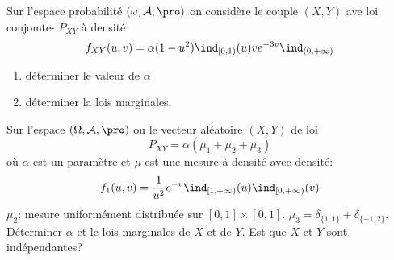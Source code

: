 \begin{examplebox}
	Sur l'espace probabilité $(\omega, \mathcal{A}, \pro)$ on considère le couple $(X, Y)$ ave loi conjomte- $P_{XY}$ à densité
	$$f_{XY}(u,v)=\alpha(1-u^2)\ind_{[0,1)}(u)v e^{-3v}\ind_{(0, +\infty)}$$
	\begin{enumerate}
		\item déterminer le valeur de $\alpha$
		\item déterminer la lois marginales.
	\end{enumerate}
\end{examplebox}

\begin{examplebox}
	Sur l'espace $(\Omega,\mathcal{A},\pro)$ ou le vecteur aléatoire $(X, Y)$ de loi
	$$P_{XY}=\alpha(\mu_1+\mu_2+\mu_3)$$
	où $\alpha$ est un paramètre et $\mu$ est une mesure à densité avec densité:
		$$f_1(u, v)=\frac{1}{u^2}e^{-v}\ind_{[1,+\infty)}(u)\ind_{[0, +\infty)}(v)$$
	$\mu_2$: mesure uniformément distribuée sur $[0,1]\times[0,1]$. $\mu_3=\delta_{\{1,1\}}+\delta_{\{-1,2\}}$. Déterminer $\alpha$ et le lois marginales de $X$ et de $Y$. Est que $X$ et $Y$ sont indépendantes?
\end{examplebox}

